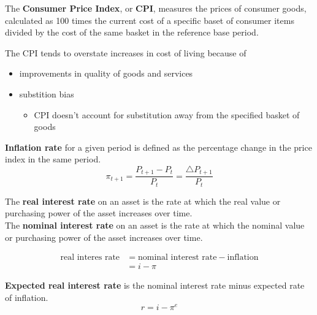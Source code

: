 \documentclass[letterpaper, 9pt,landscape]{extarticle}
\begin{document}
\begin{multicols*}{5}
\begin{definition}
    The \textbf{Consumer Price Index}, or \textbf{CPI}, measures the prices of consumer goods, calculated as 100 times the current cost of a specific baset of consumer items divided by the cost of the same basket in the reference base period.
\end{definition}

\begin{remark}
    The CPI tends to overstate increases in cost of living because of
    \begin{itemize}
        \item improvements in quality of goods and services
        \item substition bias
        \begin{itemize}
            \item CPI doesn't account for substitution away from the specified basket of goods
        \end{itemize} 
    \end{itemize} 
\end{remark}

\begin{definition}
    \textbf{Inflation rate} for a given period is defined as the percentage change in the price index in the same period.
    \[
        \pi_{t + 1} = \frac{P_{t + 1} - P_t}{P_t} = \frac{\triangle P_{t+1}}{P_t}
    \]
\end{definition}

\begin{definition}
    The \textbf{real interest rate} on an asset is the rate at which the real value or purchasing power of the asset increases over time. \\


    The \textbf{nominal interest rate} on an asset is the rate at which the nominal value or purchasing power of the asset increases over time.

    \begin{align*}
    \text{real interes rate} &= \text{nominal interest rate} - \text{inflation} \\
    &= i - \pi
    \end{align*}
\end{definition}

\begin{definition}
    \textbf{Expected real interest rate} is the nominal interest rate minus expected rate of inflation. 
    \[
        r = i - \pi^e
    \]
\end{definition}


\end{multicols*}
\end{document}
